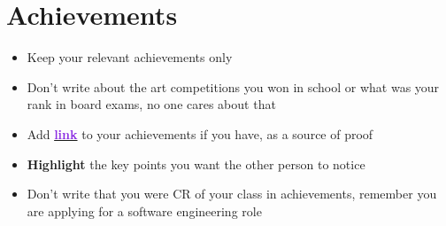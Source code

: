 \documentclass[letterpaper,11pt]{article}
\newcommand{\resumeItem}[1]{
  \item\small{
    {#1 \vspace{-2pt}}
  }
}
\newcommand{\resumeItemListStart}{\begin{itemize}}
\newcommand{\resumeItemListEnd}{\end{itemize}\vspace{-5pt}}
\begin{document}
\section{Achievements}
\resumeItemListStart
    \resumeItem{Keep your relevant achievements only}
    \resumeItem{Don't write about the art competitions you won in school or what was your rank in board exams, no one cares about that}
    \resumeItem{Add \href{https://google.com/}{\textcolor{BlueViolet}{\textbf{link}}} to your achievements if you have, as a source of proof}
    \resumeItem{\textbf{Highlight} the key points you want the other person to notice}
    \resumeItem{Don't write that you were CR of your class in achievements, remember you are applying for a software engineering role}
\resumeItemListEnd

\end{document}
